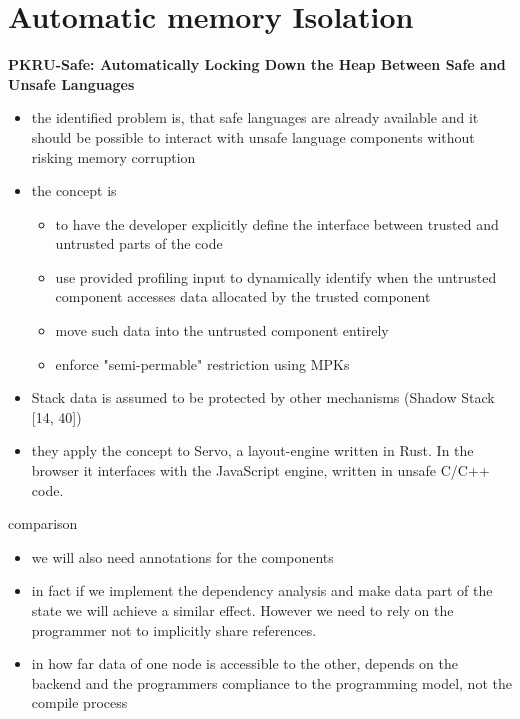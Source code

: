 \section{Automatic memory Isolation}



 \textbf{PKRU-Safe: Automatically Locking Down the Heap
Between Safe and Unsafe Languages}\cite{kirth2022pkru}
\begin{itemize}
    \item the identified problem is, that safe languages are already available and it should be possible to interact with unsafe language components without risking memory corruption
    \item the concept is 
    \begin{itemize}
        \item to have the developer explicitly define the interface between trusted and untrusted parts of the code
        \item use provided profiling input to dynamically identify when the untrusted component accesses data allocated by the trusted component
        \item move such data into the untrusted component entirely 
        \item enforce "semi-permable" restriction using MPKs 
    \end{itemize}
    \item Stack data is assumed to be protected by other mechanisms (Shadow Stack [14, 40])
    \item they apply the concept to Servo, a layout-engine written in Rust. In the browser it interfaces with the JavaScript engine, written in unsafe C/C++ code.  
\end{itemize}
comparison
\begin{itemize}
    \item we will also need annotations for the components
    \item in fact if we implement the dependency analysis and make data part of the state we will achieve a similar effect. However we need to rely on the programmer not to implicitly share references.
    \item in how far data of one node is accessible to the other, depends on the backend and the programmers compliance to the programming model, not the compile process 
\end{itemize}